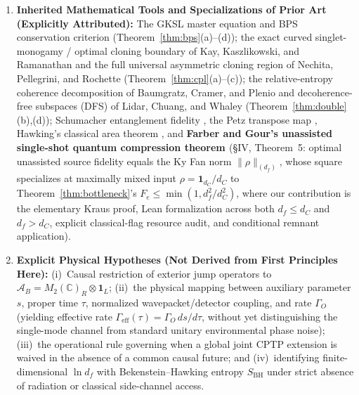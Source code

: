 \documentclass[11pt,a4paper]{article}
\theoremstyle{definition}
\theoremstyle{remark}
\newcommand{\cA}{\mathcal{A}}
\newcommand{\bbC}{\mathbb{C}}
\newcommand{\1}{\mathbf{1}}
\newcommand{\code}[1]{{\footnotesize\ttfamily #1}}
\begin{document}
\begin{enumerate}
\begin{itemize}
    \item \emph{Auditable formal and numerical verification:} Machine-checking the finite-dimensional algebraic core (50~audited public declarations) in Lean~4.36.0 + Mathlib4 (zero tactic-linter warnings; clean kernel log in \code{lean4/\allowbreak VERIFICATION\_\allowbreak LOG.txt}) paired with a deterministic self-checking Python suite (451~numeric fields, pinned \code{scripts/requirements.txt}).
  \end{itemize}
  \item \textbf{Inherited Mathematical Tools and Specializations of Prior Art (Explicitly Attributed):}
  The GKSL master equation and BPS conservation criterion \cite{Lindblad1976,GKS1976,BPS1984} (Theorem~\ref{thm:bps}(a)--(d)); the exact curved singlet-monogamy / optimal cloning boundary of Kay, Kaszlikowski, and Ramanathan \cite{Kay2009} and the full universal asymmetric cloning region of Nechita, Pellegrini, and Rochette \cite{Nechita2021} (Theorem~\ref{thm:cpl}(a)--(c)); the relative-entropy coherence decomposition of Baumgratz, Cramer, and Plenio \cite{Baumgratz2014} and decoherence-free subspaces (DFS) of Lidar, Chuang, and Whaley \cite{Lidar1998} (Theorem~\ref{thm:double}(b),(d)); Schumacher entanglement fidelity \cite{Schumacher1996}, the Petz transpose map \cite{Petz1986}, Hawking's classical area theorem \cite{Hawking1971}, and \textbf{Farber and Gour's unassisted single-shot quantum compression theorem \cite{FarberGour2026}} (§IV, Theorem~5: optimal unassisted source fidelity equals the Ky Fan norm $\|\rho\|_{(d_f)}$, whose square specializes at maximally mixed input $\rho=\1_{d_C}/d_C$ to Theorem~\ref{thm:bottleneck}'s $F_e\le\min(1,d_f^2/d_C^2)$, where our contribution is the elementary Kraus proof, Lean formalization across both $d_f\le d_C$ and $d_f>d_C$, explicit classical-flag resource audit, and conditional remnant application).
  \item \textbf{Explicit Physical Hypotheses (Not Derived from First Principles Here):}
  (i)~Causal restriction of exterior jump operators to $\cA_B = M_2(\bbC)_R\otimes\1_L$; (ii)~the physical mapping between auxiliary parameter $s$, proper time $\tau$, normalized wavepacket/detector coupling, and rate $\Gamma_O$ (yielding effective rate $\Gamma_{\mathrm{eff}}(\tau)=\Gamma_O\,ds/d\tau$, without yet distinguishing the single-mode channel from standard unitary environmental phase noise); (iii)~the operational rule governing when a global joint CPTP extension is waived in the absence of a common causal future; and (iv)~identifying finite-dimensional $\ln d_f$ with Bekenstein--Hawking entropy $S_{\mathrm{BH}}$ under strict absence of radiation or classical side-channel access.

\end{enumerate}
\end{document}
